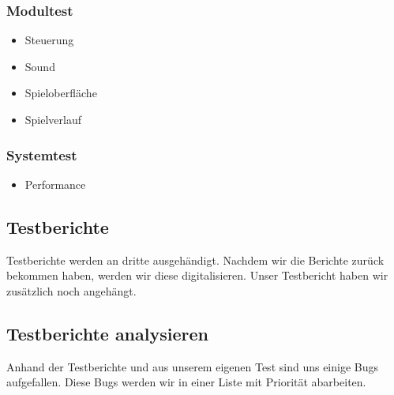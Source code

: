 \subsubsection{Modultest}
\begin{itemize}
	\item Steuerung
	\item Sound
	\item Spieloberfläche
	\item Spielverlauf
\end{itemize}
\subsubsection{Systemtest}
\begin{itemize}
	\item Performance
\end{itemize}
\subsection{Testberichte}
Testberichte werden an dritte ausgehändigt. Nachdem wir die Berichte zurück bekommen haben, werden wir diese digitalisieren. 
Unser Testbericht haben wir zusätzlich noch angehängt. 




\subsection{Testberichte analysieren}
Anhand der Testberichte und aus unserem eigenen Test sind uns einige Bugs aufgefallen. Diese Bugs werden wir in einer Liste mit Priorität abarbeiten.
